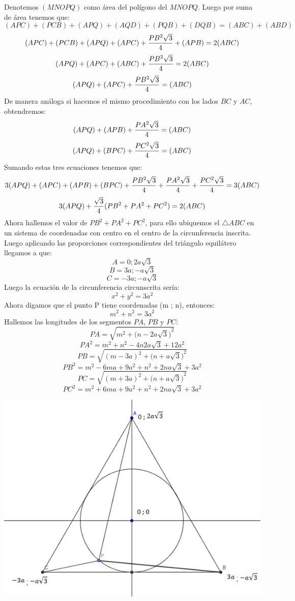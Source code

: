 \documentclass{book}
\begin{document}
\begin{enumerate}
          Denotemos $(MNOPQ)$ como área del polígono del $MNOPQ$.
          Luego por suma de área tenemos que:
          $$(APC)+(PCB)+(APQ)+(AQD)+(PQB)+(DQB)=(ABC)+(ABD)$$
          $$(APC)+(PCB)+(APQ)+(APC)+{PB^2\sqrt{3}\over 4}+(APB)=2(ABC)$$
          $$(APQ)+(APC)+(ABC)+{PB^2\sqrt{3}\over 4}=2(ABC)$$
          $$(APQ)+(APC)+{PB^2\sqrt{3}\over 4}=(ABC)$$
          De manera análoga si hacemos el mismo procedimiento con los lados $BC$ y $AC$, obtendremos:
          $$(APQ)+(APB)+{PA^2\sqrt{3}\over 4}=(ABC)$$
          $$(APQ)+(BPC)+{PC^2\sqrt{3}\over 4}=(ABC)$$
          Sumando estas tres ecuaciones tenemos que:
          $$3(APQ)+(APC)+(APB)+(BPC)+{PB^2\sqrt{3}\over 4}+{PA^2\sqrt{3}\over 4}+{PC^2\sqrt{3}\over 4}=3(ABC)$$
          $$3(APQ)+{\sqrt{3}\over 4} (PB^2+PA^2+PC^2 )=2(ABC)$$
          Ahora hallemos el valor de $PB^2+PA^2+PC^2$, para ello ubiquemos el $\triangle ABC$ en un sistema de coordenadas con centro en el centro de la circunferencia inscrita. Luego aplicando las proporciones correspondientes del triángulo equilátero llegamos a que:
          $$A=0 ;2a\sqrt{3}$$
          $$B=3a ; -a\sqrt{3}$$
          $$C=-3a ; -a\sqrt{3}$$
          Luego la ecuación de la circunferencia circunscrita sería:
          $$x^2+y^2=3a^2$$
          Ahora digamos que el punto P tiene coordenadas (m ; n), entonces:
          $$m^2+n^2=3a^2$$
          Hallemos las longitudes de los segmentos $PA$, $PB$ y $PC$:
          $$PA=\sqrt{m^2+{\big(n-2a\sqrt{3}\big)}^2 }$$
          $$PA^2=m^2+n^2-4n2a\sqrt{3}+12a^2$$
          $$PB=\sqrt{{(m-3a)}^2+{\big(n+a\sqrt{3}\big)}^2 }$$
          $$PB^2=m^2-6ma+9a^2+n^2+2na\sqrt{3}+3a^2$$
          $$PC=\sqrt{{(m+3a)}^2+{\big(n+a\sqrt{3}\big)}^2 }$$
          $$PC^2=m^2+6ma+9a^2+n^2+2na\sqrt{3}+3a^2$$
          \begin{center}
              \includegraphics[scale=1]{imagenes/Geometria/24,2.png}

\end{center}
\end{enumerate}
\end{document}
